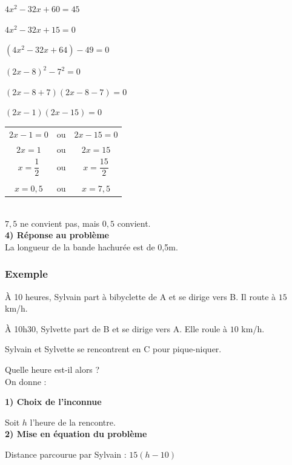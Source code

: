 $ 4x^2 - 32x + 60 = 45 $

$ 4x^2 - 32x + 15 = 0 $

$ \left(4x^2 - 32x  + 64\right)-49=0 $

$ \left(2x - 8\right)^2 - 7^2 = 0 $

$ \left(2x-8+7\right)\left(2x-8-7\right) = 0 $

$ \left(2x-1\right)\left(2x-15\right) = 0 $ \\

\begin{tabular}{ccc}
$2x-1=0$ & ou &$2x-15=0$ \\
$2x=1$ & ou & $2x = 15$ \\
$x=\dfrac{1}{2}$& ou &$ x = \dfrac{15}{2} $ \\
\\
$x=0,5$& ou &$x= 7,5$ \\
\end{tabular} \\

$7,5$ ne convient pas, mais $0,5$ convient. \\

\textbf{4) Réponse au problème} \\

La longueur de la bande hachurée est de 0,5m.

\newpage

\subsubsection{Exemple }

À 10 heures, Sylvain part à bibyclette de A et se dirige vers B. Il route à $15$ km/h.

À 10h30, Sylvette part de B et se dirige vers A. Elle roule à $10$ km/h.


Sylvain et Sylvette se rencontrent en C pour pique-niquer.

Quelle heure est-il alors ?\\

On donne : 


\textbf{1) Choix de l'inconnue}

Soit $h$ l'heure de la rencontre. \\

\textbf{2) Mise en équation du problème} 

Distance parcourue par Sylvain : $15\left(h-10\right)$ \\

